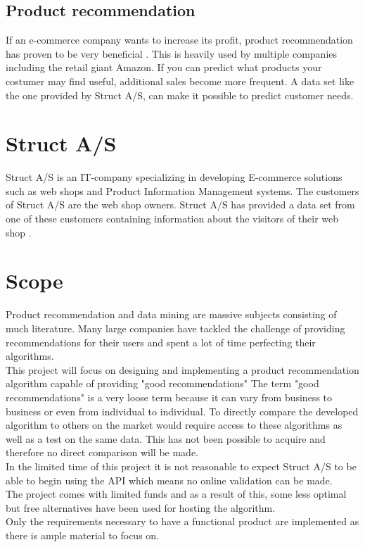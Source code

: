 \color{black}
\subsection{Product recommendation}
If an e-commerce company wants to increase its profit, product recommendation has proven to be very beneficial \cite{BigCommerce}. This is heavily used by multiple companies including the retail giant Amazon\cite{Fortune}. If you can predict what products your costumer may find useful, additional sales become more frequent. A data set like the one provided by Struct A/S, can make it possible to predict customer needs.

\section{Struct A/S}
Struct A/S is an IT-company specializing in developing E-commerce solutions such as web shops and Product Information Management systems. The customers of Struct A/S are the web shop owners. Struct A/S has provided a data set from one of these customers containing information about the visitors of their web shop \cite{Struct}.


\section{Scope}
Product recommendation and data mining are massive subjects consisting of much literature. Many large companies have tackled the challenge of providing recommendations for their users and spent a lot of time perfecting their algorithms.\\
This project will focus on designing and implementing a product recommendation algorithm capable of providing "good recommendations" The term "good recommendations" is a very loose term because it can vary from business to business or even from individual to individual. To directly compare the developed algorithm to others on the market would require access to these algorithms as well as a test on the same data. This has not been possible to acquire and therefore no direct comparison will be made. \\
In the limited time of this project it is not reasonable to expect Struct A/S to be able to begin using the API which means no online validation can be made. \\
The project comes with limited funds and as a result of this, some less optimal but free alternatives have been used for hosting the algorithm. \\
Only the requirements necessary to have a functional product are implemented as there is ample material to focus on.
